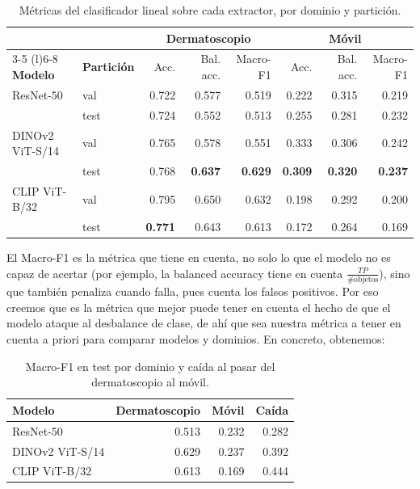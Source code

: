 \documentclass[10pt,a4paper]{article}
\renewcommand{\_}{\guionbajo\allowbreak}
\begin{document}
\begin{table}[H]
    \centering
    \small
    \renewcommand{\arraystretch}{1.2}
    \begin{tabular}{@{}llrrrrrr@{}}
        \toprule
        & & \multicolumn{3}{c}{\textbf{Dermatoscopio}} & \multicolumn{3}{c}{\textbf{Móvil}} \\
        \cmidrule(lr){3-5} \cmidrule(l){6-8}
        \textbf{Modelo} & \textbf{Partición} & Acc. & Bal. acc. & Macro-F1 & Acc. & Bal. acc. & Macro-F1 \\
        \midrule
        ResNet-50     & val  & 0.722 & 0.577 & 0.519 & 0.222 & 0.315 & 0.219 \\
                      & test & 0.724 & 0.552 & 0.513 & 0.255 & 0.281 & 0.232 \\
        \midrule
        DINOv2 ViT-S/14 & val  & 0.765 & 0.578 & 0.551 & 0.333 & 0.306 & 0.242 \\
                        & test & 0.768 & \textbf{0.637} & \textbf{0.629} & \textbf{0.309} & \textbf{0.320} & \textbf{0.237} \\
        \midrule
        CLIP ViT-B/32 & val  & 0.795 & 0.650 & 0.632 & 0.198 & 0.292 & 0.200 \\
                      & test & \textbf{0.771} & 0.643 & 0.613 & 0.172 & 0.264 & 0.169 \\
        \bottomrule
    \end{tabular}
    \caption{Métricas del clasificador lineal sobre cada extractor, por dominio y partición.}
    \label{tab:metricas-modelos}
\end{table}

\noindent El Macro-F1 es la métrica que tiene en cuenta, no solo lo que el modelo
no es capaz de acertar (por ejemplo, la balanced accuracy tiene en cuenta $\frac{TP}{\text{\# objetos}}$), 
sino que también penaliza cuando falla, pues cuenta los falsos positivos. Por eso creemos que es la métrica que mejor 
puede tener en cuenta el hecho de que el modelo ataque al desbalance de clase, de ahí que sea nuestra métrica a tener en
cuenta a priori para comparar modelos y dominios. En concreto, obtenemos:

\begin{table}[H]
    \centering
    \small
    \renewcommand{\arraystretch}{1.2}
    \begin{tabular}{@{}lrrr@{}}
        \toprule
        \textbf{Modelo} & \textbf{Dermatoscopio} & \textbf{Móvil} & \textbf{Caída} \\
        \midrule
        ResNet-50       & 0.513 & 0.232 & 0.282 \\
        DINOv2 ViT-S/14 & 0.629 & 0.237 & 0.392 \\
        CLIP ViT-B/32   & 0.613 & 0.169 & 0.444 \\
        \bottomrule
    \end{tabular}
    \caption{Macro-F1 en test por dominio y caída al pasar del dermatoscopio al móvil.}
    \label{tab:caida-dominio}
\end{table}
\end{document}
